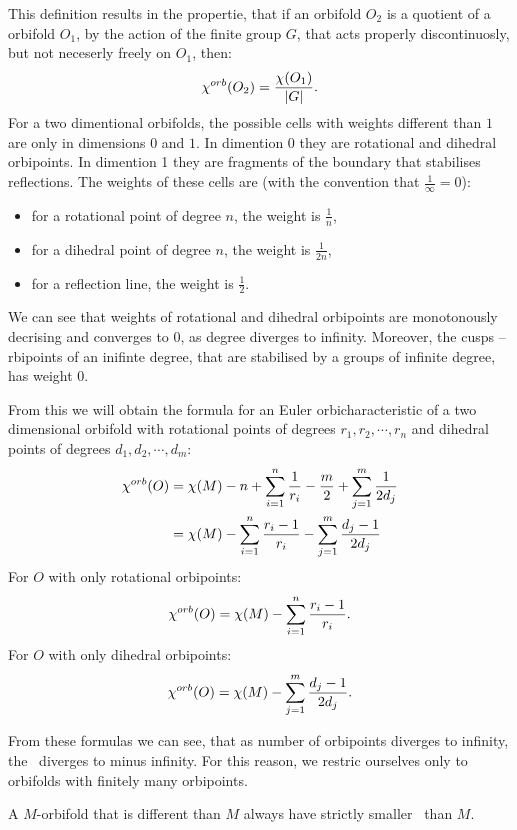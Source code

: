 This definition results in the propertie, that if an orbifold $O_2$ is a quotient 
of a orbifold $O_1$, by the action of the finite group $G$, that acts properly 
discontinuosly, but not neceserly freely on $O_1$, then:
\begin{equation}
{\chi^{orb}(O_2)} = \frac{\chi(O_1)}{|G|}.
\end{equation}
For a two dimentional orbifolds, the possible cells with weights different than $1$ are 
only in dimensions $0$ and $1$. In dimention 0 they are rotational and dihedral 
orbipoints. In dimention 1 they are fragments of the boundary that stabilises reflections. 
The weights of these cells are (with the convention that $\frac{1}{\infty} = 0$):
\begin{itemize}
\item for a rotational point of degree $n$, the weight is $\frac{1}{n}$,
\item for a dihedral point of degree $n$, the weight is $\frac{1}{2n}$,
\item for a reflection line, the weight is $\frac{1}{2}$.
\end{itemize}
We can see that weights of rotational and dihedral orbipoints are monotonously decrising 
and converges to $0$, as degree diverges to infinity. Moreover, the 
cusps -- rbipoints of an inifinte degree, 
that are stabilised by a groups of infinite degree, has weight $0$.

From this we will obtain the formula for an Euler orbicharacteristic of a two dimensional 
orbifold with rotational points of degrees $r_1, r_2, \cdots, r_n$ and dihedral points 
of degrees $d_1, d_2, \cdots, d_m$:
\begin{align}\label{chi orb expression}
{\chi^{orb}(O)} &= \chi (M) - n + \sum_{i=1}^n \frac{1}{r_i} - \frac{m}{2} + \sum_{j=1}^m \frac{1}{2d_j} \\
&= \chi (M) - \sum_{i=1}^n \frac{r_i-1}{r_i} - \sum_{j=1}^m \frac{d_j-1}{2d_j}
\end{align}
For $O$ with only rotational orbipoints:
\begin{equation}\label{chi orb expression rotational}
{\chi^{orb}(O)} = \chi (M) - \sum_{i=1}^n \frac{r_i-1}{r_i}.
\end{equation}
For $O$ with only dihedral orbipoints:
\begin{equation}\label{chi orb expression dihedral}
{\chi^{orb}(O)} = \chi (M) - \sum_{j=1}^m \frac{d_j-1}{2d_j}.
\end{equation}

From these formulas we can see, that as number of orbipoints diverges to infinity, the \Eoc\ 
diverges to minus infinity. For this reason, we restric ourselves only to orbifolds 
with finitely many orbipoints.
\begin{observation}\label{orbifolds have smaller Eoc than their base manifolds}
A $M$-orbifold that is different than $M$ always have strictly smaller \Eoc\ than $M$. 
\end{observation}


